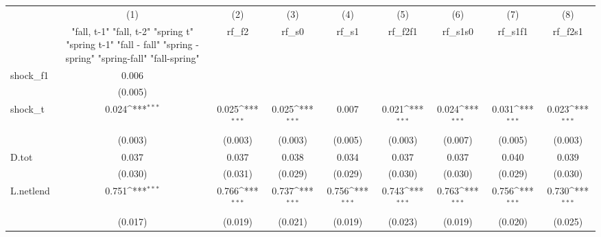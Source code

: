 {
\def\sym#1{\ifmmode^{#1}\else\(^{#1}\)\fi}
\begin{tabular}{l*{8}{c}}
\toprule
            &\multicolumn{1}{c}{(1)}&\multicolumn{1}{c}{(2)}&\multicolumn{1}{c}{(3)}&\multicolumn{1}{c}{(4)}&\multicolumn{1}{c}{(5)}&\multicolumn{1}{c}{(6)}&\multicolumn{1}{c}{(7)}&\multicolumn{1}{c}{(8)}\\
            &\multicolumn{1}{c}{  "fall, t-1" "fall, t-2" "spring t" "spring t-1"  "fall - fall" "spring - spring" "spring-fall" "fall-spring" }&\multicolumn{1}{c}{rf\_f2}&\multicolumn{1}{c}{rf\_s0}&\multicolumn{1}{c}{rf\_s1}&\multicolumn{1}{c}{rf\_f2f1}&\multicolumn{1}{c}{rf\_s1s0}&\multicolumn{1}{c}{rf\_s1f1}&\multicolumn{1}{c}{rf\_f2s1}\\
\midrule
shock\_f1    &       0.006         &                     &                     &                     &                     &                     &                     &                     \\
            &     (0.005)         &                     &                     &                     &                     &                     &                     &                     \\
\addlinespace
shock\_t     &       0.024\sym{***}&       0.025\sym{***}&       0.025\sym{***}&       0.007         &       0.021\sym{***}&       0.024\sym{***}&       0.031\sym{***}&       0.023\sym{***}\\
            &     (0.003)         &     (0.003)         &     (0.003)         &     (0.005)         &     (0.003)         &     (0.007)         &     (0.005)         &     (0.003)         \\
\addlinespace
D.tot       &       0.037         &       0.037         &       0.038         &       0.034         &       0.037         &       0.037         &       0.040         &       0.039         \\
            &     (0.030)         &     (0.031)         &     (0.029)         &     (0.029)         &     (0.030)         &     (0.030)         &     (0.029)         &     (0.030)         \\
\addlinespace
L.netlend   &       0.751\sym{***}&       0.766\sym{***}&       0.737\sym{***}&       0.756\sym{***}&       0.743\sym{***}&       0.763\sym{***}&       0.756\sym{***}&       0.730\sym{***}\\
            &     (0.017)         &     (0.019)         &     (0.021)         &     (0.019)         &     (0.023)         &     (0.019)         &     (0.020)         &     (0.025)         \\

\end{tabular}}
